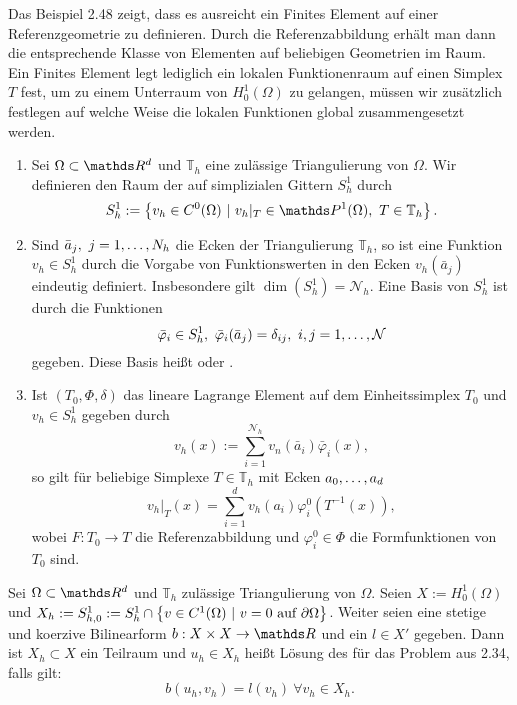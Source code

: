 Das Beispiel 2.48 zeigt, dass es ausreicht ein Finites Element auf einer Referenzgeometrie zu definieren.
Durch die Referenzabbildung erhält man dann die entsprechende Klasse von Elementen auf beliebigen Geometrien im Raum.\\

Ein Finites Element legt lediglich ein lokalen Funktionenraum auf einen Simplex $T$ fest, um zu einem Unterraum von $H^1_0(\Omega)$ zu gelangen, müssen wir zusätzlich festlegen auf welche Weise die lokalen Funktionen global zusammengesetzt werden.

\begin{enumerate}[(1)]
\item Sei $\Omega\subset\R^d$ und $\mathbb{T}_h$ eine zulässige Triangulierung von $\Omega$.
Wir definieren den Raum der  auf simplizialen Gittern $S_h^1$ durch
\[
S_h^1 := \penbrace{v_h\in C^0(\Omega)~|~v_h|_T\in \Pw^1(\Omega),~T\in\mathbb{T}_h}.
\]
\item Sind $\bar{a}_j,~j=1, \dots ,N_h$ die Ecken der Triangulierung $\mathbb{T}_h$, so ist eine Funktion $v_h\in S_h^1$ durch die Vorgabe von Funktionswerten in den Ecken $v_h(\bar{a}_j)$ eindeutig definiert.
Insbesondere gilt $\dim(S_h^1)= \mathcal{N}_h$.
Eine Basis von $S_h^1$ ist durch die Funktionen
\[
\bar{\varphi}_i\in S_h^1,~\bar{\varphi}_i(\bar{a}_j)=\delta_{ij},~i,j=1, \dots ,\mathcal{N}
\]
gegeben.
Diese Basis heißt  oder .
\item Ist $(T_0,\Phi,\delta)$ das lineare Lagrange Element auf dem Einheitssimplex $T_0$ und $v_h\in S_h^1$ gegeben durch
\[
v_h(x):=\sum_{i=1}^{\mathcal{N}_h}v_n(\bar{a}_i)\bar{\varphi}_i(x),
\]
so gilt für beliebige Simplexe $T\in \mathbb{T}_h$ mit Ecken $a_0, \dots ,a_d$
\[
v_h|_T(x) = \sum_{i=1}^{d}v_h(a_i)\varphi_i^0(T^{-1}(x)),
\]
wobei $F:T_0\to T$ die Referenzabbildung und $\varphi_i^0\in \Phi$ die Formfunktionen von $T_0$ sind.
\end{enumerate}

Sei $\Omega\subset\R^d$ und $\mathbb{T}_h$ zulässige Triangulierung von $\Omega$.
Seien $X:=H_0^1(\Omega)$ und $X_h:= S_{h,0}^1:=S_h^1\cap \left\{v\in C^1(\Omega)~|~v=0 \text{ auf }\partial\Omega\right\}$.
Weiter seien eine stetige und koerzive Bilinearform $b:X\times X\to \R$ und ein $l\in X'$ gegeben.
Dann ist $X_h\subset X$ ein Teilraum und $u_h\in X_h$ heißt Lösung des  für das Problem aus 2.34, falls gilt:
\[
b(u_h,v_h)= l(v_h) ~\forall v_h\in X_h.
\]

